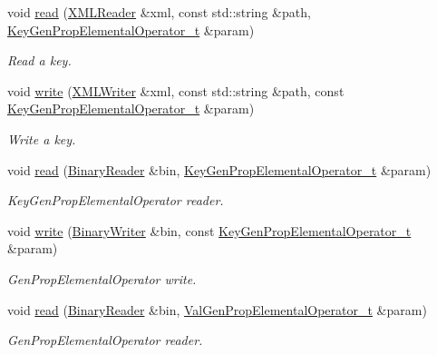 \begin{DoxyCompactItemize}
void \mbox{\hyperlink{namespaceHadron_a9c6649bbe7b32cbc5fcbf8ebbf17d987}{read}} (\mbox{\hyperlink{classADATXML_1_1XMLReader}{X\+M\+L\+Reader}} \&xml, const std\+::string \&path, \mbox{\hyperlink{structHadron_1_1KeyGenPropElementalOperator__t}{Key\+Gen\+Prop\+Elemental\+Operator\+\_\+t}} \&param)
\begin{DoxyCompactList}\small\item\em Read a key. \end{DoxyCompactList}\item 
void \mbox{\hyperlink{namespaceHadron_a67dc2040c75fb33a942bc5a59243c4c3}{write}} (\mbox{\hyperlink{classADATXML_1_1XMLWriter}{X\+M\+L\+Writer}} \&xml, const std\+::string \&path, const \mbox{\hyperlink{structHadron_1_1KeyGenPropElementalOperator__t}{Key\+Gen\+Prop\+Elemental\+Operator\+\_\+t}} \&param)
\begin{DoxyCompactList}\small\item\em Write a key. \end{DoxyCompactList}\item 
void \mbox{\hyperlink{namespaceHadron_ac6d19c651cf61c129b5cf86c15d13ab5}{read}} (\mbox{\hyperlink{classADATIO_1_1BinaryReader}{Binary\+Reader}} \&bin, \mbox{\hyperlink{structHadron_1_1KeyGenPropElementalOperator__t}{Key\+Gen\+Prop\+Elemental\+Operator\+\_\+t}} \&param)
\begin{DoxyCompactList}\small\item\em Key\+Gen\+Prop\+Elemental\+Operator reader. \end{DoxyCompactList}\item 
void \mbox{\hyperlink{namespaceHadron_af1d6496318c689e52be27a9f842ccc2d}{write}} (\mbox{\hyperlink{classADATIO_1_1BinaryWriter}{Binary\+Writer}} \&bin, const \mbox{\hyperlink{structHadron_1_1KeyGenPropElementalOperator__t}{Key\+Gen\+Prop\+Elemental\+Operator\+\_\+t}} \&param)
\begin{DoxyCompactList}\small\item\em Gen\+Prop\+Elemental\+Operator write. \end{DoxyCompactList}\item 
void \mbox{\hyperlink{namespaceHadron_a26908582ef57fc950c0944a69dfcc275}{read}} (\mbox{\hyperlink{classADATIO_1_1BinaryReader}{Binary\+Reader}} \&bin, \mbox{\hyperlink{structHadron_1_1ValGenPropElementalOperator__t}{Val\+Gen\+Prop\+Elemental\+Operator\+\_\+t}} \&param)
\begin{DoxyCompactList}\small\item\em Gen\+Prop\+Elemental\+Operator reader. \end{DoxyCompactList}\item 

\end{DoxyCompactItemize}
